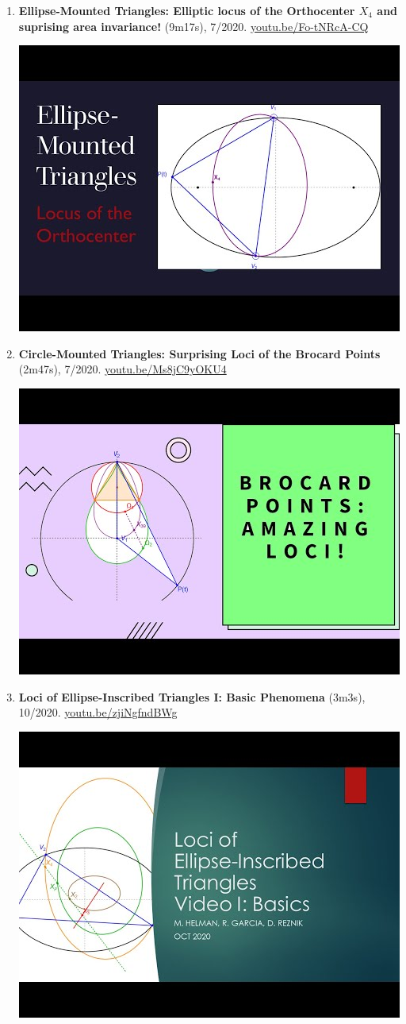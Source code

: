 \documentclass[12pt]{article}
\begin{document}
\begin{enumerate}[resume]
\item \textbf{Ellipse-Mounted Triangles: Elliptic locus of the Orthocenter $X_{4}$ and suprising area invariance!} (9m17s), 7/2020. \href{https://youtu.be/Fo-tNRcA-CQ}{\url{youtu.be/Fo-tNRcA-CQ}}
\begin{center}\includegraphics[width=.5\textwidth]{pics/Fo-tNRcA-CQ.jpg}\end{center}
% 
\item \textbf{Circle-Mounted Triangles: Surprising Loci of the Brocard Points} (2m47s), 7/2020. \href{https://youtu.be/Ms8jC9yOKU4}{\url{youtu.be/Ms8jC9yOKU4}}
\begin{center}\includegraphics[width=.5\textwidth]{pics/Ms8jC9yOKU4.jpg}\end{center}
% 
\item \textbf{Loci of Ellipse-Inscribed Triangles I: Basic Phenomena} (3m3s), 10/2020. \href{https://youtu.be/zjiNgfndBWg}{\url{youtu.be/zjiNgfndBWg}}
\begin{center}\includegraphics[width=.5\textwidth]{pics/zjiNgfndBWg.jpg}\end{center}

\end{enumerate}
\end{document}
